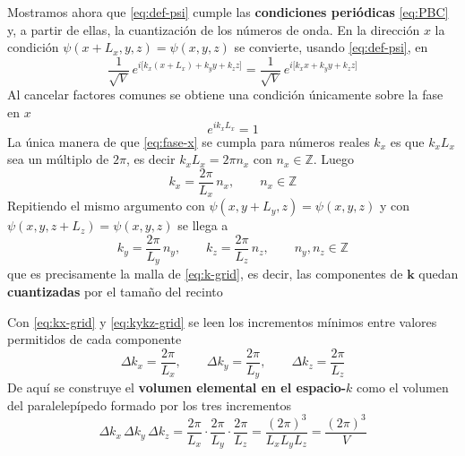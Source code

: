 \documentclass{article}
\begin{document}
Mostramos ahora que \eqref{eq:def-psi} cumple las \textcolor{Cerulean}{\textbf{condiciones periódicas}} \eqref{eq:PBC} y, a partir de ellas, la cuantización de los números de onda. En la dirección $x$ la condición $\psi(x+L_x,y,z)=\psi(x,y,z)$ se convierte, usando \eqref{eq:def-psi}, en
\begin{equation}\label{eq:PBC-x}
\frac{1}{\sqrt V}\,e^{i\big[k_x(x+L_x)+k_y y+k_z z\big]}
=\frac{1}{\sqrt V}\,e^{i\big[k_x x+k_y y+k_z z\big]}
\end{equation}
Al cancelar factores comunes se obtiene una condición únicamente sobre la fase en $x$
\begin{equation}\label{eq:fase-x}
e^{i k_x L_x}=1
\end{equation}
La única manera de que \eqref{eq:fase-x} se cumpla para números reales $k_x$ es que $k_xL_x$ sea un múltiplo de $2\pi$, es decir $k_xL_x=2\pi n_x$ con $n_x\in\mathbb Z$. Luego
\begin{equation}\label{eq:kx-grid}
k_x=\frac{2\pi}{L_x}\,n_x,\qquad n_x\in\mathbb Z
\end{equation}
Repitiendo el mismo argumento con $\psi(x,y+L_y,z)=\psi(x,y,z)$ y con $\psi(x,y,z+L_z)=\psi(x,y,z)$ se llega a
\begin{equation}\label{eq:kykz-grid}
k_y=\frac{2\pi}{L_y}\,n_y,\qquad
k_z=\frac{2\pi}{L_z}\,n_z,\qquad
n_y,n_z\in\mathbb Z
\end{equation}
que es precisamente la malla de \eqref{eq:k-grid}, es decir, las componentes de $\mathbf k$ quedan \textcolor{Cerulean}{\textbf{cuantizadas}} por el tamaño del recinto

Con \eqref{eq:kx-grid} y \eqref{eq:kykz-grid} se leen los incrementos mínimos entre valores permitidos de cada componente
\begin{equation}\label{eq:delta-ks}
\Delta k_x=\frac{2\pi}{L_x},\qquad
\Delta k_y=\frac{2\pi}{L_y},\qquad
\Delta k_z=\frac{2\pi}{L_z}
\end{equation}
De aquí se construye el \textcolor{Cerulean}{\textbf{volumen elemental en el espacio-$k$}} como el volumen del paralelepípedo formado por los tres incrementos
\begin{equation}\label{eq:cell-k}
\Delta k_x\,\Delta k_y\,\Delta k_z
=\frac{2\pi}{L_x}\cdot\frac{2\pi}{L_y}\cdot\frac{2\pi}{L_z}
=\frac{(2\pi)^3}{L_xL_yL_z}
=\frac{(2\pi)^3}{V}
\end{equation}
\end{document}
